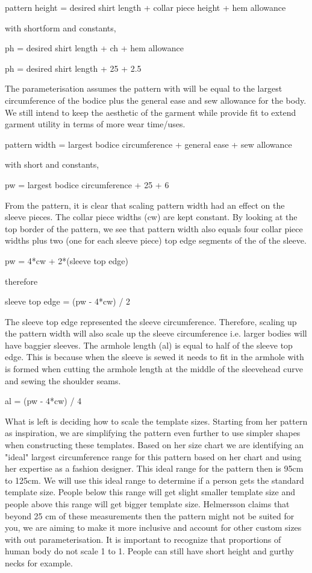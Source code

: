 pattern height = desired shirt length + collar piece height + hem allowance

with shortform and constants,

ph = desired shirt length + ch + hem allowance

ph = desired shirt length + 25 + 2.5

The parameterisation assumes the pattern with will be equal to the largest circumference of the bodice plus the general ease and sew allowance for the body. We still intend to keep the aesthetic of the garment while provide fit to extend garment utility in terms of more wear time/uses.

pattern width = largest bodice circumference + general ease + sew allowance

with short and constants,

pw = largest bodice circumference + 25 + 6

From the pattern, it is clear that scaling pattern width had an effect on the sleeve pieces. The collar piece widths (cw) are kept constant. By looking at the top border of the pattern, we see that pattern width also equals four collar piece widths plus two (one for each sleeve piece) top edge segments of the of the sleeve.

pw = 4*cw + 2*(sleeve top edge)

therefore

sleeve top edge = (pw - 4*cw) / 2

The sleeve top edge represented the sleeve circumference. Therefore, scaling up the pattern width will also scale up the sleeve circumference i.e. larger bodies will have baggier sleeves.
The armhole length (al) is equal to half of the sleeve top edge. This is because when the sleeve is sewed it needs to fit in the armhole with is formed when cutting the armhole length at the middle of the sleevehead curve and sewing the shoulder seams.

al = (pw - 4*cw) / 4

What is left is deciding how to scale the template sizes. Starting from her pattern as inspiration, we are simplifying the pattern even further to use simpler shapes when constructing these templates. Based on her size chart we are identifying an "ideal" largest circumference range for this pattern based on her chart and using her expertise as a fashion designer. This ideal range for the pattern then is 95cm to 125cm. We will use this ideal range to determine if a person gets the standard template size. People below this range will get slight smaller template size and people above this range will get bigger template size. Helmersson claims that beyond 25 cm of these measurements then the pattern might not be suited for you, we are aiming to make it more inclusive and account for other custom sizes with out parameterisation. It is important to recognize that proportions of human body do not scale 1 to 1. People can still have short height and gurthy necks for example.

